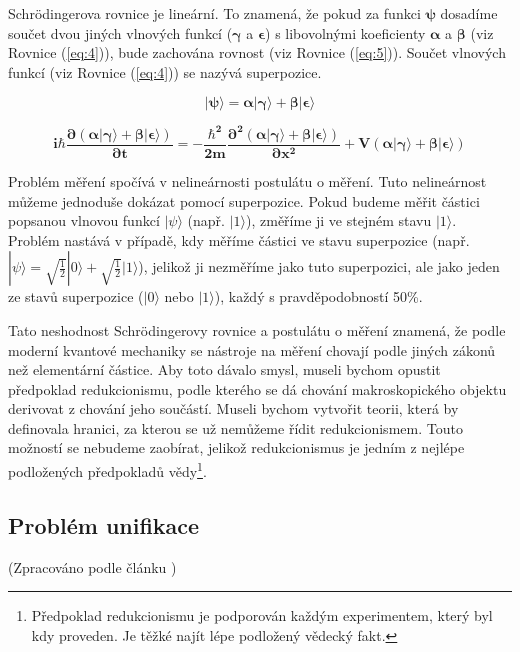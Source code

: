 Schrödingerova rovnice je lineární. To znamená, že pokud za funkci $\bm{\psi}$ dosadíme součet dvou jiných vlnových funkcí ($\bm{\gamma}$ a $\bm{\epsilon}$) s libovolnými koeficienty $\bm{\alpha}$ a $\bm{\beta}$ (viz Rovnice (\ref{eq:4})), bude zachována rovnost (viz Rovnice (\ref{eq:5})). Součet vlnových funkcí (viz Rovnice (\ref{eq:4})) se nazývá superpozice.


\begin{equation}
    \bm{|\psi\rangle = \alpha|\gamma\rangle + \beta|\epsilon\rangle}
    \label{eq:4}
\end{equation}

\begin{equation}
    \bm{i\hbar \frac{\partial \bm{(\alpha|\gamma\rangle + \beta|\epsilon\rangle)}}{\partial t} = -\frac{\hbar^2}{2m}
    \frac{\partial^2 \bm{(\alpha|\gamma\rangle + \beta|\epsilon\rangle)}}{\partial x^2} + V \bm{(\alpha|\gamma\rangle + \beta|\epsilon\rangle)}}
    \label{eq:5}
\end{equation}

Problém měření spočívá v nelineárnosti postulátu o měření. Tuto nelineárnost může\-me jednoduše dokázat pomocí superpozice. Pokud budeme měřit částici popsanou vlnovou funkcí $|\psi\rangle$ (např. $|1\rangle$), změříme ji ve stejném stavu $|1\rangle$. Problém nastává v případě, kdy měříme částici ve stavu superpozice (např. $|\psi\rangle = \sqrt{\frac{1}{2}}|0\rangle + \sqrt{\frac{1}{2}}|1\rangle$), jelikož ji nezměříme jako tuto superpozici, ale jako jeden ze stavů superpozice ($|0\rangle$ nebo $|1\rangle$), každý s pravděpodobností 50\%.

Tato neshodnost Schrödingerovy rovnice a postulátu o měření znamená, že podle moderní kvantové mechaniky se nástroje na měření chovají podle jiných zákonů než elementární částice. Aby toto dávalo smysl, museli bychom opustit předpoklad redukcionismu, podle kterého se dá chování makroskopického objektu derivovat z chování jeho součástí. Museli bychom vytvořit teorii, která by definovala hranici, za kterou se už nemůžeme řídit redukcionismem. Touto možností se nebudeme zaobírat, jelikož redukcionismus je jedním z nejlépe podložených předpokladů vědy\footnote[2]{Předpoklad redukcionismu je podporován každým experimentem, který byl kdy proveden. Je těžké najít lépe podložený vědecký fakt.}. 

\subsection{Problém unifikace} 
(Zpracováno podle článku \cite{unifprob})

